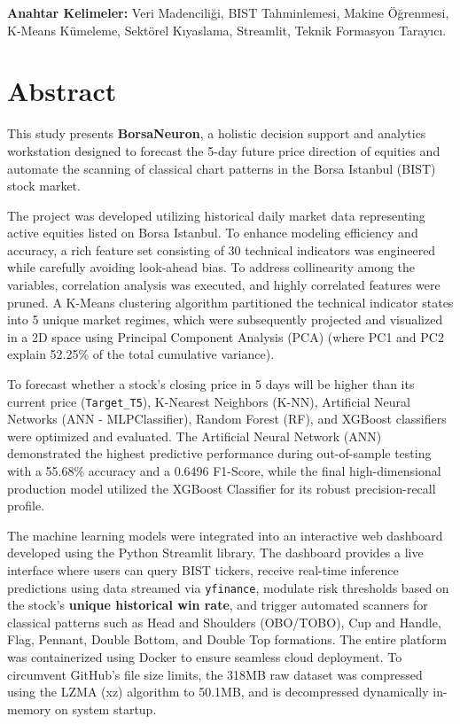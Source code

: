\documentclass[12pt,a4paper]{report}
\begin{document}
\vspace*{1cm}
\noindent \textbf{Anahtar Kelimeler:} Veri Madenciliği, BIST Tahminlemesi, Makine Öğrenmesi, K-Means Kümeleme, Sektörel Kıyaslama, Streamlit, Teknik Formasyon Tarayıcı.

\newpage

\chapter*{Abstract}
This study presents \textbf{BorsaNeuron}, a holistic decision support and analytics workstation designed to forecast the 5-day future price direction of equities and automate the scanning of classical chart patterns in the Borsa Istanbul (BIST) stock market. 

The project was developed utilizing historical daily market data representing active equities listed on Borsa Istanbul. To enhance modeling efficiency and accuracy, a rich feature set consisting of 30 technical indicators was engineered while carefully avoiding look-ahead bias. To address collinearity among the variables, correlation analysis was executed, and highly correlated features were pruned. A K-Means clustering algorithm partitioned the technical indicator states into 5 unique market regimes, which were subsequently projected and visualized in a 2D space using Principal Component Analysis (PCA) (where PC1 and PC2 explain 52.25\% of the total cumulative variance).

To forecast whether a stock's closing price in 5 days will be higher than its current price (\texttt{Target\_T5}), K-Nearest Neighbors (K-NN), Artificial Neural Networks (ANN - MLPClassifier), Random Forest (RF), and XGBoost classifiers were optimized and evaluated. The Artificial Neural Network (ANN) demonstrated the highest predictive performance during out-of-sample testing with a 55.68\% accuracy and a 0.6496 F1-Score, while the final high-dimensional production model utilized the XGBoost Classifier for its robust precision-recall profile.

The machine learning models were integrated into an interactive web dashboard developed using the Python Streamlit library. The dashboard provides a live interface where users can query BIST tickers, receive real-time inference predictions using data streamed via \texttt{yfinance}, modulate risk thresholds based on the stock's \textbf{unique historical win rate}, and trigger automated scanners for classical patterns such as Head and Shoulders (OBO/TOBO), Cup and Handle, Flag, Pennant, Double Bottom, and Double Top formations. The entire platform was containerized using Docker to ensure seamless cloud deployment. To circumvent GitHub's file size limits, the 318MB raw dataset was compressed using the LZMA (xz) algorithm to 50.1MB, and is decompressed dynamically in-memory on system startup.
\end{document}
